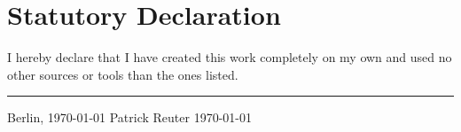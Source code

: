 \chapter*{\LARGE Statutory Declaration}
I hereby declare that I have created this work completely on my own and used no other sources or tools than the ones listed.
\vspace{2em}

\noindent

\vspace{30 mm}
\begin{flushright}

\rule{90mm}{1pt}

Berlin, \today \hspace{15 mm} Patrick Reuter \today{}
\end{flushright}
